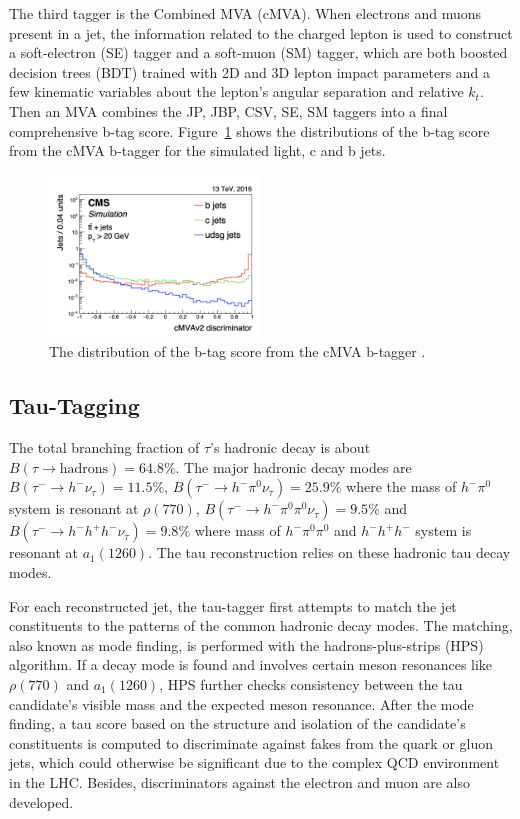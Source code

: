 The third tagger is the Combined MVA (cMVA). When electrons and muons present in a jet, the information related to the charged lepton is used to construct a soft-electron (SE) tagger and a soft-muon (SM) tagger, which are both boosted decision trees (BDT) trained with 2D and 3D lepton impact parameters and a few kinematic variables about the lepton's angular separation and relative $k_t$. Then an MVA combines the JP, JBP, CSV, SE, SM taggers into a final comprehensive b-tag score. Figure~\ref{fig:cmsexperiment:reconstruction:cMVA} shows the distributions of the b-tag score from the cMVA b-tagger for the simulated light, c and b jets.

\begin{figure}[ht]
    \centering
    \includegraphics[width=0.5\textwidth]{chapters/CMSExperiment/sectionReconstruction/figures/cMVA}
    \caption{The distribution of the b-tag score from the cMVA b-tagger \cite{Sirunyan:2017ezt}. }
    \label{fig:cmsexperiment:reconstruction:cMVA}
\end{figure}





\subsection{Tau-Tagging}

The total branching fraction of $\tau$'s hadronic decay is about $B(\tau \to \text{hadrons} ) = 64.8\%$. The major hadronic decay modes are $B(\tau^- \to h^- \nu_\tau)=11.5\% $, $B(\tau^- \to h^- \pi^0 \nu_\tau)=25.9\% $ where the mass of $h^-\pi^0$ system is resonant at $\rho(770)$, $B(\tau^- \to h^- \pi^0 \pi^0 \nu_\tau)=9.5\% $ and $B(\tau^- \to h^- h^+ h^- \nu_\tau)=9.8\% $ where mass of $h^- \pi^0 \pi^0$ and $h^- h^+ h^- $ system is resonant at $a_1(1260)$. The tau reconstruction relies on these hadronic tau decay modes.

For each reconstructed jet, the tau-tagger first attempts to match the jet constituents to the patterns of the common hadronic decay modes. The matching, also known as mode finding, is performed with the hadrons-plus-strips (HPS) algorithm. If a decay mode is found and involves certain meson resonances like $\rho(770)$ and $a_1(1260)$, HPS further checks consistency between the tau candidate's visible mass and the expected meson resonance. After the mode finding, a tau score based on the structure and isolation of the candidate's constituents is computed to discriminate against fakes from the quark or gluon jets, which could otherwise be significant due to the complex QCD environment in the LHC. Besides, discriminators against the electron and muon are also developed.


